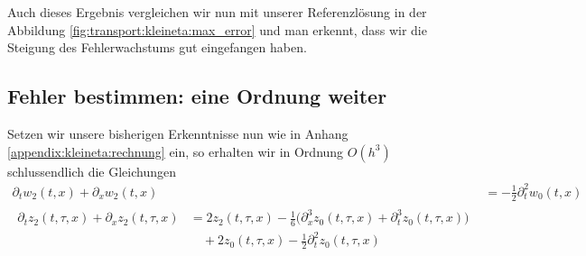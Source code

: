 Auch dieses Ergebnis vergleichen wir nun mit unserer Referenzlösung in der Abbildung \ref{fig:transport:kleineta:max_error} und man erkennt, dass wir die Steigung des Fehlerwachstums gut eingefangen haben.

\subsection*{Fehler bestimmen: eine Ordnung weiter}

Setzen wir unsere bisherigen Erkenntnisse nun wie in Anhang \ref{appendix:kleineta:rechnung} ein, so erhalten wir in Ordnung $O(h^3)$ schlussendlich die Gleichungen
\begin{align}
\partial_t w_2(t,x) + \partial_x w_2(t,x) &= - \frac{1}{2} \partial^2_t w_0(t,x)\\
\begin{split}
\partial_t z_2(t,\tau,x) + \partial_x z_2(t,\tau,x) &= 2 z_2(t,\tau,x) - \frac{1}{6} \bigl( \partial^3_x z_0(t,\tau,x) + \partial^3_t z_0(t, \tau, x) \bigr)\\
&\quad + 2 z_0(t, \tau, x) - \frac{1}{2} \partial^2_t z_0(t, \tau, x)
\end{split}
\end{align}

